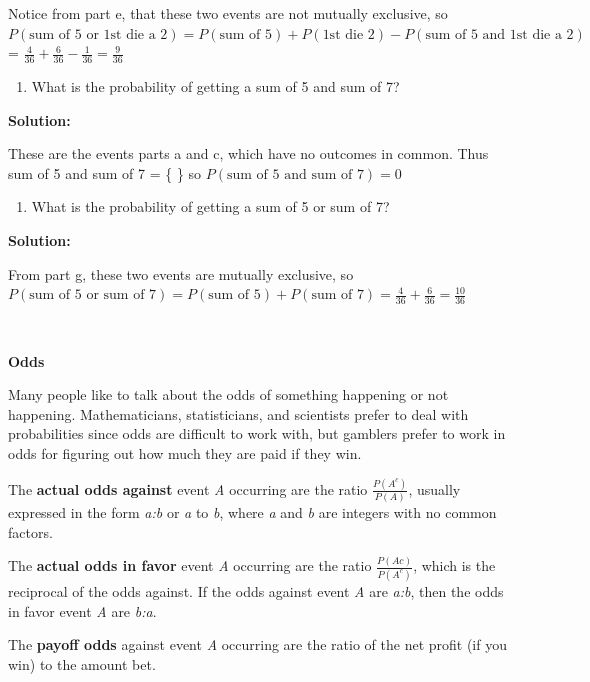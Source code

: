 \documentclass[
]{book}
\providecommand{\tightlist}{%
  \setlength{\itemsep}{0pt}\setlength{\parskip}{0pt}}
\begin{document}
Notice from part e, that these two events are not mutually exclusive, so \(P(\text{sum of 5 or 1st die a 2})=P(\text{sum of 5})+P(\text{1st die 2})-P(\text{sum of 5 and 1st die a 2})\) = \(\frac{4}{36}+\frac{6}{36}-\frac{1}{36}=\frac{9}{36}\)

\begin{enumerate}
\def\labelenumi{\alph{enumi}.}
\setcounter{enumi}{6}
\tightlist
\item
  What is the probability of getting a sum of 5 and sum of 7?
\end{enumerate}

\textbf{Solution:}

These are the events parts a and c, which have no outcomes in common. Thus sum of 5 and sum of 7 = \{ \} so \(P(\text{sum of 5 and sum of 7})=0\)

\begin{enumerate}
\def\labelenumi{\alph{enumi}.}
\setcounter{enumi}{7}
\tightlist
\item
  What is the probability of getting a sum of 5 or sum of 7?
\end{enumerate}

\textbf{Solution:}

From part g, these two events are mutually exclusive, so \(P(\text{sum of 5 or sum of 7})=P(\text{sum of 5})+P(\text{sum of 7})=\frac{4}{36}+\frac{6}{36}=\frac{10}{36}\)

\textbf{\\
}

\textbf{Odds}

Many people like to talk about the odds of something happening or not happening. Mathematicians, statisticians, and scientists prefer to deal with probabilities since odds are difficult to work with, but gamblers prefer to work in odds for figuring out how much they are paid if they win.

The \textbf{actual odds against} event \emph{A} occurring are the ratio \(\frac{P(A^c)}{P(A)}\), usually expressed in the form \emph{a:b} or \emph{a} to \emph{b}, where \emph{a} and \emph{b} are integers with no common factors.

The \textbf{actual odds in favor} event \emph{A} occurring are the ratio \(\frac{P(Ac)}{P(A^c)}\), which is the reciprocal of the odds against. If the odds against event \emph{A} are \emph{a:b}, then the odds in favor event \emph{A} are \emph{b:a}.

The \textbf{payoff odds} against event \emph{A} occurring are the ratio of the net profit (if you win) to the amount bet.
\end{document}
